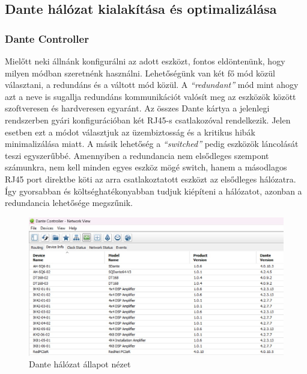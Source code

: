 \subsection{Dante hálózat kialakítása és optimalizálása}
\subsubsection{Dante Controller}
Mielőtt neki állnánk konfigurálni az adott eszközt, fontos eldöntenünk, hogy
milyen módban szeretnénk használni.
Lehetőségünk van két fő mód közül választani, a redundáns és a
váltott mód közül. A \textit{``redundant''} mód mint ahogy azt a neve is sugallja
redundáns kommunikációt valósít meg az eszközök között szoftveresen és
hardveresen egyaránt. Az összes Dante kártya a jelenlegi rendszerben gyári konfigurációban két RJ45-s
csatlakozóval rendelkezik. Jelen esetben ezt a módot választjuk az
üzembiztosság és a kritikus hibák minimalizálása miatt.
A másik lehetőség a \textit{``switched''} pedig eszközök láncolását
teszi egyszerűbbé. Amennyiben a redundancia nem elsődleges szempont számunkra, nem kell
minden egyes eszköz mögé switch, hanem a másodlagos RJ45 port direktbe köti
az arra csatlakoztatott eszközt az elsődleges hálózatra. Így gyorsabban és
költséghatékonyabban tudjuk kiépíteni a hálózatot, azonban a redundancia lehetősége megszűnik.
\begin{figure}[H]
	\centering
	\includegraphics[width=\textwidth, keepaspectratio]{figures/dante_devices.jpg}
	\caption{Dante hálózat állapot nézet}\label{fig:dante_devices}
\end{figure}
